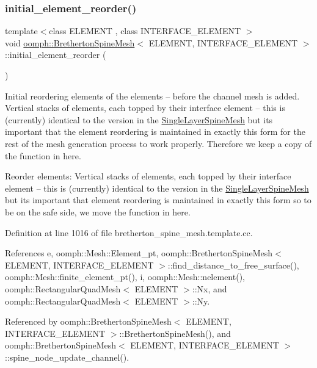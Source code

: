 \subsubsection{\texorpdfstring{initial\+\_\+element\+\_\+reorder()}{initial\_element\_reorder()}}
{\footnotesize\ttfamily template$<$class E\+L\+E\+M\+E\+NT , class I\+N\+T\+E\+R\+F\+A\+C\+E\+\_\+\+E\+L\+E\+M\+E\+NT $>$ \\
void \hyperlink{classoomph_1_1BrethertonSpineMesh}{oomph\+::\+Bretherton\+Spine\+Mesh}$<$ E\+L\+E\+M\+E\+NT, I\+N\+T\+E\+R\+F\+A\+C\+E\+\_\+\+E\+L\+E\+M\+E\+NT $>$\+::initial\+\_\+element\+\_\+reorder (\begin{DoxyParamCaption}{ }\end{DoxyParamCaption})\hspace{0.3cm}{\ttfamily [protected]}}



Initial reordering elements of the elements -- before the channel mesh is added. Vertical stacks of elements, each topped by their interface element -- this is (currently) identical to the version in the \hyperlink{classoomph_1_1SingleLayerSpineMesh}{Single\+Layer\+Spine\+Mesh} but it\textquotesingle{}s important that the element reordering is maintained in exactly this form for the rest of the mesh generation process to work properly. Therefore we keep a copy of the function in here. 

Reorder elements\+: Vertical stacks of elements, each topped by their interface element -- this is (currently) identical to the version in the \hyperlink{classoomph_1_1SingleLayerSpineMesh}{Single\+Layer\+Spine\+Mesh} but it\textquotesingle{}s important that element reordering is maintained in exactly this form so to be on the safe side, we move the function in here. 

Definition at line 1016 of file bretherton\+\_\+spine\+\_\+mesh.\+template.\+cc.



References e, oomph\+::\+Mesh\+::\+Element\+\_\+pt, oomph\+::\+Bretherton\+Spine\+Mesh$<$ E\+L\+E\+M\+E\+N\+T, I\+N\+T\+E\+R\+F\+A\+C\+E\+\_\+\+E\+L\+E\+M\+E\+N\+T $>$\+::find\+\_\+distance\+\_\+to\+\_\+free\+\_\+surface(), oomph\+::\+Mesh\+::finite\+\_\+element\+\_\+pt(), i, oomph\+::\+Mesh\+::nelement(), oomph\+::\+Rectangular\+Quad\+Mesh$<$ E\+L\+E\+M\+E\+N\+T $>$\+::\+Nx, and oomph\+::\+Rectangular\+Quad\+Mesh$<$ E\+L\+E\+M\+E\+N\+T $>$\+::\+Ny.



Referenced by oomph\+::\+Bretherton\+Spine\+Mesh$<$ E\+L\+E\+M\+E\+N\+T, I\+N\+T\+E\+R\+F\+A\+C\+E\+\_\+\+E\+L\+E\+M\+E\+N\+T $>$\+::\+Bretherton\+Spine\+Mesh(), and oomph\+::\+Bretherton\+Spine\+Mesh$<$ E\+L\+E\+M\+E\+N\+T, I\+N\+T\+E\+R\+F\+A\+C\+E\+\_\+\+E\+L\+E\+M\+E\+N\+T $>$\+::spine\+\_\+node\+\_\+update\+\_\+channel().

